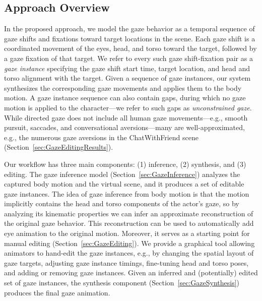 \subsection{Approach Overview}

In the proposed approach, we model the gaze behavior as a temporal sequence of gaze shifts and fixations toward target locations in the scene. Each gaze shift is a coordinated movement of the eyes, head, and torso toward the target, followed by a gaze fixation of that target. We refer to every such gaze shift-fixation pair as a \emph{gaze instance} specifying the gaze shift start time, target location, and head and torso alignment with the target. Given a sequence of gaze instances, our system synthesizes the corresponding gaze movements and applies them to the body motion. A gaze instance sequence can also contain gaps, during which no gaze motion is applied to the character---we refer to such gaps as \emph{unconstrained gaze}.
While directed gaze does not include all human gaze movements---e.g., smooth pursuit, saccades, and conversational aversions---many are well-approximated, e.g., the numerous gaze aversions in the ChatWithFriend scene (Section~\ref{sec:GazeEditingResults}).

Our workflow has three main components: (1) inference, (2) synthesis, and (3) editing. The gaze inference model (Section~\ref{sec:GazeInference}) analyzes the captured body motion and the virtual scene, and it produces a set of editable gaze instances. The idea of gaze inference from body motion is that the motion implicitly contains the head and torso components of the actor's gaze, so by analyzing its kinematic properties we can infer an approximate reconstruction of the original gaze behavior. This reconstruction can be used to automatically add eye animation to the original motion. Moreover, it serves as a starting point for manual editing (Section~\ref{sec:GazeEditing}). We provide a graphical tool allowing animators to hand-edit the gaze instances, e.g., by changing the spatial layout of gaze targets, adjusting gaze instance timings, fine-tuning head and torso poses, and adding or removing gaze instances. Given an inferred and (potentially) edited set of gaze instances, the synthesis component (Section~\ref{sec:GazeSynthesis}) produces the final gaze animation.